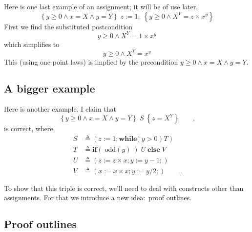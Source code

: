 \documentclass[11pt]{article}%
\begin{document}
Here is one last example of an assignment; it will be of use later.%
\[
\left\{  y\geq0\wedge x=X\wedge y=Y\right\}  \;z:=1;\;\left\{  y\geq0\wedge
X^{Y}=z\times x^{y}\right\}
\]
First we find the substituted postcondition%
\[
y\geq0\wedge X^{Y}=1\times x^{y}%
\]
which simplifies to
\[
y\geq0\wedge X^{Y}=x^{y}%
\]
This (using one-point laws) is implied by the precondition $y\geq0\wedge
x=X\wedge y=Y$.

\subsection{A bigger example}

Here is another example. I claim that
\begin{equation}
\left\{  y\geq0\wedge x=X\wedge y=Y\right\}  \;S\;\left\{  z=X^{Y}\right\}
\qquad\text{,} \label{a}%
\end{equation}
is correct, where
\begin{align*}
S  &  \triangleq\left(  z:=1;\mathbf{while(}\;y>0\;)\;T\right) \\
T  &  \triangleq\mathbf{if}(\;\mathit{\mathrm{odd}}(y)\;)\;U\;\mathbf{else}%
\;V\\
U  &  \triangleq(z:=z\times x;y:=y-1;)\\
V  &  \triangleq(x:=x\times x;y:=y/2;)\qquad\text{.}%
\end{align*}


To show that this triple is correct, we'll need to deal with constructs other
than assignments. For that we introduce a new idea:\ proof outlines.

\subsection{Proof outlines}%
\end{document}
